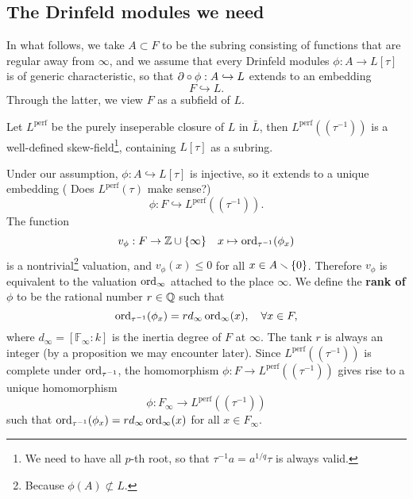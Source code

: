 \documentclass{article}
\newcommand{\F}{\mathbb{F}}
\newcommand{\perf}{\mathrm{perf}}
\renewcommand{\O}{\mathcal{O}}
\begin{document}


\subsection{The Drinfeld modules we need}

In what follows, we take $A\subset F$ to be the subring consisting of functions that are regular away from $\infty$,
and we assume that every Drinfeld modules $\phi : A\to L[\tau]$ is of generic characteristic,
so that $\partial\circ \phi : A\hookrightarrow L$ extends to an embedding \[F\hookrightarrow L.\]
Through the latter, we view $F$ as a subfield of $L$.


Let $L^\perf$ be the purely inseperable closure of $L$ in $\bar L$,
then $L^\perf((\tau^{-1}))$ is a well-defined skew-field\footnote{
    We need to have all $p$-th root,
    so that $\tau^{-1}a = a^{1/q}\tau$ is always valid.
}, containing $L[\tau]$ as a subring.


Under our assumption,
$\phi : A\hookrightarrow L[\tau]$ is injective, so it extends to a unique embedding ({\color{red} Does $L^\perf(\tau)$ make sense?})
\[\phi : F\hookrightarrow L^{\perf}((\tau^{-1})).\]
The function \[v_\phi : F\to \mathbb{Z}\cup\{\infty\}\quad x\mapsto \operatorname{ord}_{\tau^{-1}}(\phi_x) \]
is a nontrivial\footnote{
    Because $\phi(A)\not\subset L$.
} valuation, and $v_\phi(x)\le 0$ for all $x\in A\smallsetminus\{0\}$.
Therefore $v_\phi$ is equivalent to the valuation $\operatorname{ord}_\infty$ attached to the place $\infty$.
We define the \textbf{rank of $\phi$} to be the rational number $r\in\mathbb{Q}$ such that
\[\operatorname{ord}_{\tau^{-1}}(\phi_x) = rd_\infty\operatorname{ord}_\infty(x),\quad\forall x\in F,\]
where $d_\infty = [\F_\infty : k]$ is the inertia degree of $F$ at $\infty$.
The tank $r$ is always an integer (by a proposition we may encounter later).
Since $L^\perf((\tau^{-1}))$ is complete under $\operatorname{ord}_{\tau^{-1}}$, the homomorphism $\phi : F\to L^\perf((\tau^{-1}))$ gives rise to a unique homomorphism
\[\phi : F_\infty\to L^\perf((\tau^{-1}))\]
such that $\operatorname{ord}_{\tau^{-1}}(\phi_x) = rd_\infty\operatorname{ord}_\infty(x)$ for all $x\in F_\infty$.
\end{document}
